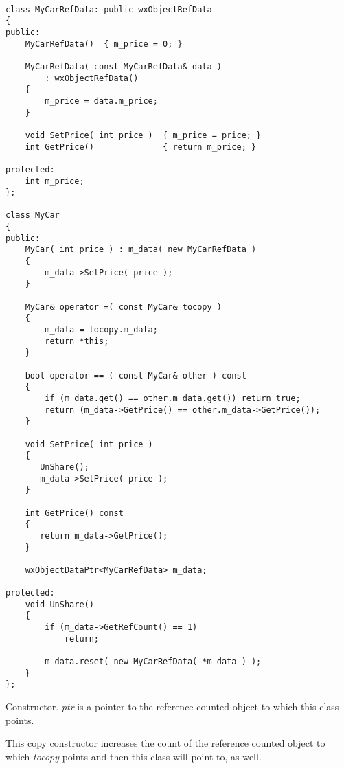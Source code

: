 \begin{verbatim}

class MyCarRefData: public wxObjectRefData
{
public:
    MyCarRefData()  { m_price = 0; }
    
    MyCarRefData( const MyCarRefData& data )
        : wxObjectRefData()
    {
        m_price = data.m_price;
    }

    void SetPrice( int price )  { m_price = price; }
    int GetPrice()              { return m_price; }
    
protected:
    int m_price;
};

class MyCar
{
public:
    MyCar( int price ) : m_data( new MyCarRefData )
    {
        m_data->SetPrice( price );
    }
    
    MyCar& operator =( const MyCar& tocopy )
    {
        m_data = tocopy.m_data;
        return *this;
    }
    
    bool operator == ( const MyCar& other ) const
    {
        if (m_data.get() == other.m_data.get()) return true;
        return (m_data->GetPrice() == other.m_data->GetPrice());
    }

    void SetPrice( int price )
    {
       UnShare();
       m_data->SetPrice( price );
    }
    
    int GetPrice() const
    {
       return m_data->GetPrice();
    }

    wxObjectDataPtr<MyCarRefData> m_data;
    
protected:
    void UnShare()
    {
        if (m_data->GetRefCount() == 1)
            return;
    
        m_data.reset( new MyCarRefData( *m_data ) );
    }
};

\end{verbatim}



\label{wxobjectdataptrwxobjectdataptr}


Constructor. {\it ptr} is a pointer to the reference
counted object to which this class points.


This copy constructor increases the count of the reference
counted object to which {\it tocopy} points and then this
class will point to, as well.

